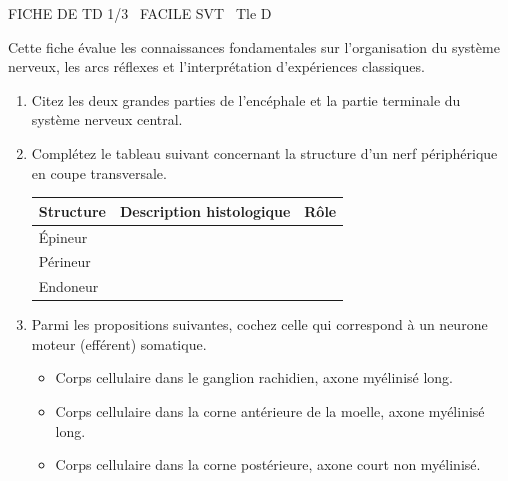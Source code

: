 \documentclass[11pt]{article}
\begin{document}
\begin{tcolorbox}[enhanced,colback=popink,colframe=popink,arc=10pt,boxrule=0pt,left=12pt,right=12pt,top=9pt,bottom=9pt]
{\color{white}\popxbold\small FICHE DE TD 1/3 \textbullet\ FACILE \hfill SVT \textbullet\ Tle D\par}
\end{tcolorbox}
\vspace{4pt}
Cette fiche évalue les connaissances fondamentales sur l'organisation du système nerveux, les arcs réflexes et l'interprétation d'expériences classiques.

\begin{exercice}
\begin{enumerate}
    \item Citez les deux grandes parties de l'encéphale et la partie terminale du système nerveux central.
    \item Complétez le tableau suivant concernant la structure d'un nerf périphérique en coupe transversale.
    \begin{tabular}{|l|c|c|}
    \hline
    \textbf{Structure} & \textbf{Description histologique} & \textbf{Rôle} \\
    \hline
    Épineur & & \\
    \hline
    Périneur & & \\
    \hline
    Endoneur & & \\
    \hline
    \end{tabular}
    \item Parmi les propositions suivantes, cochez celle qui correspond à un neurone moteur (efférent) somatique.
    \begin{itemize}
        \item[a)] Corps cellulaire dans le ganglion rachidien, axone myélinisé long.
        \item[b)] Corps cellulaire dans la corne antérieure de la moelle, axone myélinisé long.
        \item[c)] Corps cellulaire dans la corne postérieure, axone court non myélinisé.
    \end{itemize}
\end{enumerate}
\end{exercice}
\end{document}
